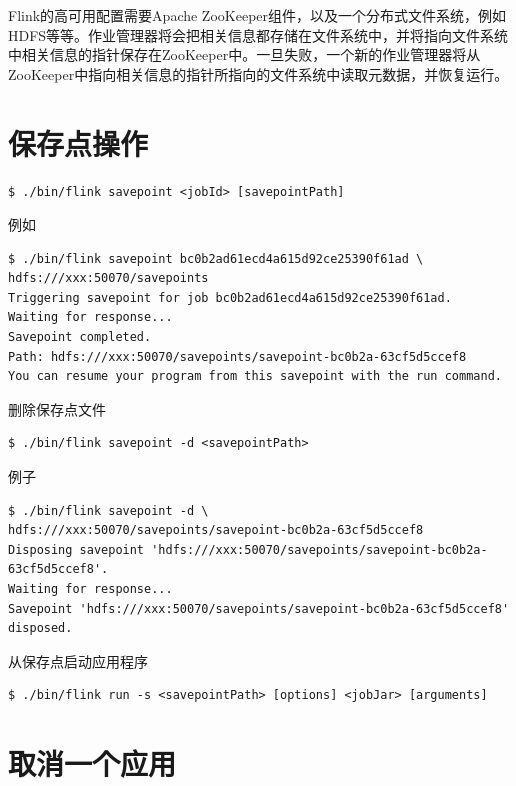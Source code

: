 \documentclass[cn,11pt,chinese]{elegantbook}
\begin{document}
Flink的高可用配置需要Apache ZooKeeper组件，以及一个分布式文件系统，例如HDFS等等。作业管理器将会把相关信息都存储在文件系统中，并将指向文件系统中相关信息的指针保存在ZooKeeper中。一旦失败，一个新的作业管理器将从ZooKeeper中指向相关信息的指针所指向的文件系统中读取元数据，并恢复运行。

\section{ 保存点操作}

\begin{verbatim}
$ ./bin/flink savepoint <jobId> [savepointPath]
\end{verbatim}

例如

\begin{verbatim}
$ ./bin/flink savepoint bc0b2ad61ecd4a615d92ce25390f61ad \
hdfs:///xxx:50070/savepoints
Triggering savepoint for job bc0b2ad61ecd4a615d92ce25390f61ad.
Waiting for response...
Savepoint completed. 
Path: hdfs:///xxx:50070/savepoints/savepoint-bc0b2a-63cf5d5ccef8
You can resume your program from this savepoint with the run command.
\end{verbatim}

删除保存点文件

\begin{verbatim}
$ ./bin/flink savepoint -d <savepointPath>
\end{verbatim}

例子

\begin{verbatim}
$ ./bin/flink savepoint -d \
hdfs:///xxx:50070/savepoints/savepoint-bc0b2a-63cf5d5ccef8
Disposing savepoint 'hdfs:///xxx:50070/savepoints/savepoint-bc0b2a-63cf5d5ccef8'.
Waiting for response...
​Savepoint 'hdfs:///xxx:50070/savepoints/savepoint-bc0b2a-63cf5d5ccef8' disposed.
\end{verbatim}

从保存点启动应用程序

\begin{verbatim}
$ ./bin/flink run -s <savepointPath> [options] <jobJar> [arguments]
\end{verbatim}

\section{取消一个应用}
\end{document}

